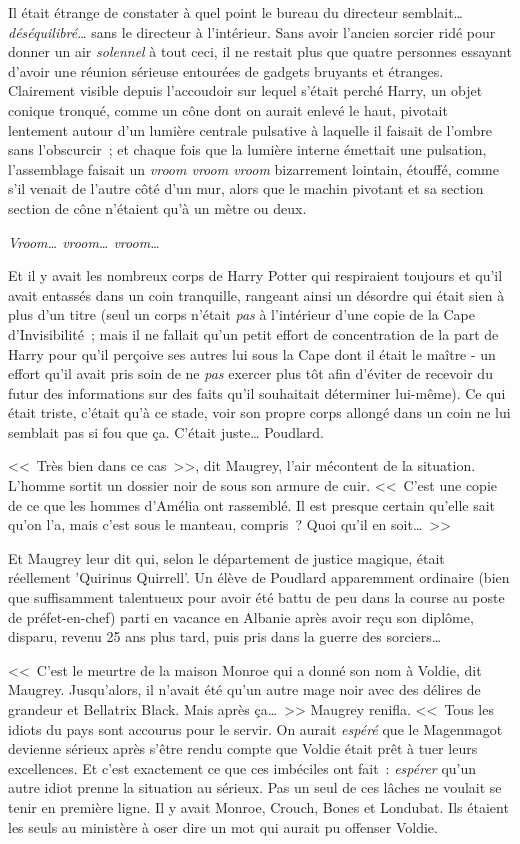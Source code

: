 Il était étrange de constater à quel point le bureau du directeur semblait… \emph{déséquilibré}… sans le directeur à l'intérieur. Sans avoir l'ancien sorcier ridé pour donner un air \emph{solennel} à tout ceci, il ne restait plus que quatre personnes essayant d'avoir une réunion sérieuse entourées de gadgets bruyants et étranges. Clairement visible depuis l'accoudoir sur lequel s'était perché Harry, un objet conique tronqué, comme un cône dont on aurait enlevé le haut, pivotait lentement autour d'un lumière centrale pulsative à laquelle il faisait de l'ombre sans l'obscurcir~; et chaque fois que la lumière interne émettait une pulsation, l'assemblage faisait un \emph{vroom vroom vroom} bizarrement lointain, étouffé, comme s'il venait de l'autre côté d'un mur, alors que le machin pivotant et sa section section de cône n'étaient qu'à un mètre ou deux.

\emph{Vroom… vroom… vroom…}

Et il y avait les nombreux corps de Harry Potter qui respiraient toujours et qu'il avait entassés dans un coin tranquille, rangeant ainsi un désordre qui était sien à plus d'un titre (seul un corps n'était \emph{pas} à l'intérieur d'une copie de la Cape d'Invisibilité~; mais il ne fallait qu'un petit effort de concentration de la part de Harry pour qu'il perçoive ses autres lui sous la Cape dont il était le maître - un effort qu'il avait pris soin de ne \emph{pas} exercer plus tôt afin d'éviter de recevoir du futur des informations sur des faits qu'il souhaitait déterminer lui-même). Ce qui était triste, c'était qu'à ce stade, voir son propre corps allongé dans un coin ne lui semblait pas si fou que ça. C'était juste… Poudlard.

<<~Très bien dans ce cas~>>, dit Maugrey, l'air mécontent de la situation. L'homme sortit un dossier noir de sous son armure de cuir. <<~C'est une copie de ce que les hommes d'Amélia ont rassemblé. Il est presque certain qu'elle sait qu'on l'a, mais c'est sous le manteau, compris~? Quoi qu'il en soit…~>>

Et Maugrey leur dit qui, selon le département de justice magique, était réellement 'Quirinus Quirrell'. Un élève de Poudlard apparemment ordinaire (bien que suffisamment talentueux pour avoir été battu de peu dans la course au poste de préfet-en-chef) parti en vacance en Albanie après avoir reçu son diplôme, disparu, revenu 25 ans plus tard, puis pris dans la guerre des sorciers…

<<~C'est le meurtre de la maison Monroe qui a donné son nom à Voldie, dit Maugrey. Jusqu'alors, il n'avait été qu'un autre mage noir avec des délires de grandeur et Bellatrix Black. Mais après ça…~>> Maugrey renifla. <<~Tous les idiots du pays sont accourus pour le servir. On aurait \emph{espéré} que le Magenmagot devienne sérieux après s'être rendu compte que Voldie était prêt à tuer leurs excellences. Et c'est exactement ce que ces imbéciles ont fait~: \emph{espérer} qu'un autre idiot prenne la situation au sérieux. Pas un seul de ces lâches ne voulait se tenir en première ligne. Il y avait Monroe, Crouch, Bones et Londubat. Ils étaient les seuls au ministère à oser dire un mot qui aurait pu offenser Voldie.

